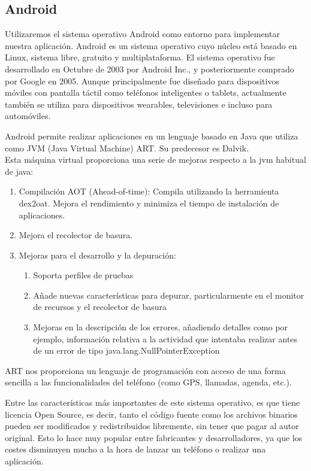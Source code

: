 \subsection{Android}
Utilizaremos el sistema operativo Android como entorno para implementar nuestra aplicación.
Android es un sistema operativo cuyo núcleo está basado en Linux, sistema libre, gratuito y multiplataforma. El sistema operativo fue desarrollado en Octubre de 2003 por Android Inc., y posteriormente comprado por Google en 2005.
Aunque principalmente fue diseñado para dispositivos móviles con pantalla táctil como teléfonos inteligentes o tablets, actualmente también se utiliza para dispositivos wearables, televisiones e incluso para automóviles.  

Android permite realizar aplicaciones en un lenguaje basado en Java que utiliza como JVM (Java Virtual Machine) ART. Su predecesor es Dalvik.\cite{ART}
\\

Esta máquina virtual proporciona una serie de mejoras respecto a la jvm habitual de java:
\begin{enumerate}
\item	Compilación AOT (Ahead-of-time): Compila utilizando la herramienta dex2oat. Mejora el rendimiento y minimiza el tiempo de instalación de aplicaciones.
\item	Mejora el recolector de basura.
\item	Mejoras para el desarrollo y la depuración:
\begin{enumerate}
\item	Soporta perfiles de pruebas
\item	Añade nuevas características para depurar, particularmente en el monitor de recursos y el recolector de basura
\item	Mejoras en la descripción de los errores, añadiendo detalles como por ejemplo, información relativa a la actividad que intentaba realizar antes de un error de tipo java.lang.NullPointerException
\end{enumerate}
\end{enumerate}

ART nos proporciona un lenguaje de programación con acceso de una forma sencilla a las funcionalidades del teléfono (como GPS, llamadas, agenda, etc.).

Entre las características más importantes de este sistema operativo, es que tiene licencia Open Source, es decir, tanto el código fuente como los archivos binarios pueden ser modificados y redistribuidos libremente, sin tener que pagar al autor original. Esto lo hace muy popular entre fabricantes y desarrolladores, ya que los costes disminuyen mucho a la hora de lanzar un teléfono o realizar una aplicación.
